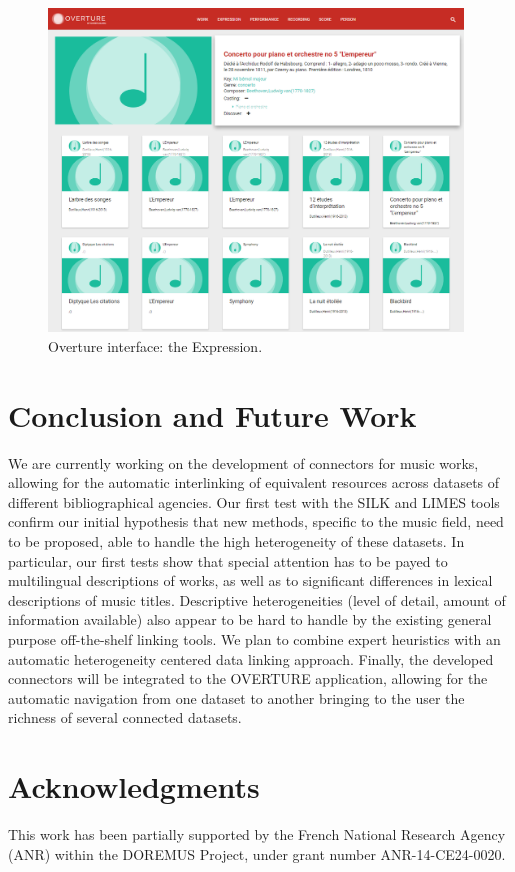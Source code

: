 \documentclass[runningheads,a4paper]{llncs}
\begin{document}
\begin{figure}
  \centering
  \includegraphics[width=11cm]{img/overture-detail.png}
  \caption{Overture interface: the Expression.}
  \label{fig:overture-detail}
\end{figure}




\section{Conclusion and Future Work}

We are currently working on the development of connectors for music works, allowing for the automatic interlinking of equivalent resources across datasets of different bibliographical agencies. Our first test with the SILK \cite{} and LIMES \cite{} tools confirm our initial hypothesis that new methods, specific to the music field, need to be proposed, able to handle the high heterogeneity of these datasets. In particular, our first tests show that special attention has to be payed to multilingual descriptions of works, as well as to significant differences in lexical descriptions of music titles. Descriptive heterogeneities (level of detail, amount of information available) also appear to be hard to handle by the existing general purpose off-the-shelf linking tools. We plan to combine expert heuristics with an automatic heterogeneity centered data linking approach. Finally, the developed connectors will be integrated to the OVERTURE application, allowing for the automatic navigation from one dataset to another bringing to the user the richness of several connected datasets.

\section*{Acknowledgments}
This work has been partially supported by the French National Research Agency (ANR) within the DOREMUS Project, under grant number ANR-14-CE24-0020.



\end{document}
